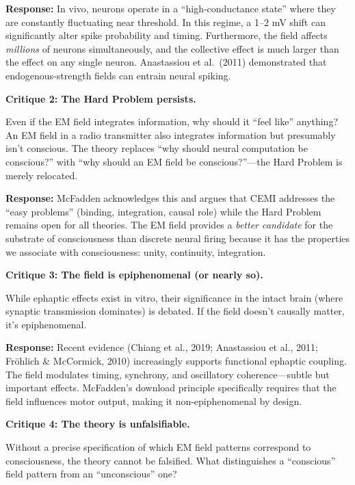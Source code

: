\documentclass[11pt,a4paper]{report}
\begin{document}
\textbf{Response:} In vivo, neurons operate in a ``high-conductance state'' where they are constantly fluctuating near threshold. In this regime, a 1--2 mV shift can significantly alter spike probability and timing. Furthermore, the field affects \emph{millions} of neurons simultaneously, and the collective effect is much larger than the effect on any single neuron. Anastassiou et al.\ (2011) demonstrated that endogenous-strength fields can entrain neural spiking.

\textbf{Critique 2: The Hard Problem persists.}

\begin{objbox}
Even if the EM field integrates information, why should it ``feel like'' anything? An EM field in a radio transmitter also integrates information but presumably isn't conscious. The theory replaces ``why should neural computation be conscious?'' with ``why should an EM field be conscious?''---the Hard Problem is merely relocated.
\end{objbox}

\textbf{Response:} McFadden acknowledges this and argues that CEMI addresses the ``easy problems'' (binding, integration, causal role) while the Hard Problem remains open for all theories. The EM field provides a \emph{better candidate} for the substrate of consciousness than discrete neural firing because it has the properties we associate with consciousness: unity, continuity, integration.

\textbf{Critique 3: The field is epiphenomenal (or nearly so).}

\begin{objbox}
While ephaptic effects exist in vitro, their significance in the intact brain (where synaptic transmission dominates) is debated. If the field doesn't causally matter, it's epiphenomenal.
\end{objbox}

\textbf{Response:} Recent evidence (Chiang et al., 2019; Anastassiou et al., 2011; Fr\"ohlich \& McCormick, 2010) increasingly supports functional ephaptic coupling. The field modulates timing, synchrony, and oscillatory coherence---subtle but important effects. McFadden's download principle specifically requires that the field influences motor output, making it non-epiphenomenal by design.

\textbf{Critique 4: The theory is unfalsifiable.}

\begin{objbox}
Without a precise specification of which EM field patterns correspond to consciousness, the theory cannot be falsified. What distinguishes a ``conscious'' field pattern from an ``unconscious'' one?
\end{objbox}
\end{document}
